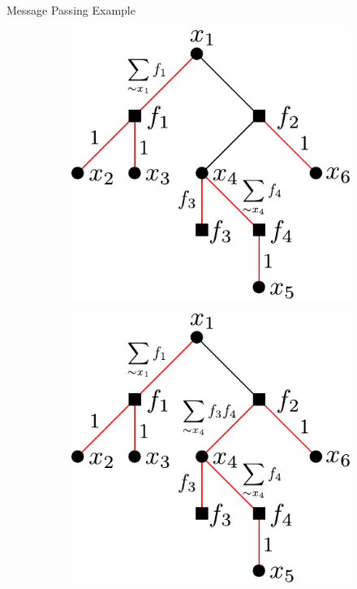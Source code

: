 \documentclass{beamer}
\begin{document}
    \begin{frame}{Message Passing Example}
   \begin{figure}
    \centering
  \begin{subfigure}{0.3\textwidth}
    \includegraphics[scale=0.6]{factor_graph_step2}
  \end{subfigure}
  \hspace{1.5cm}
  \begin{subfigure}{0.3\textwidth}
    \includegraphics[scale=0.6]{factor_graph_step3}
  \end{subfigure}
   \end{figure}

  \end{frame}
  
\end{document}
